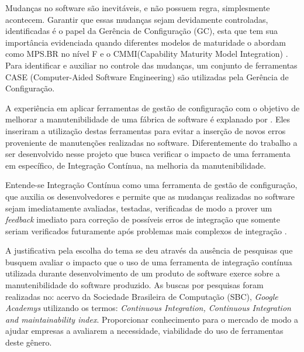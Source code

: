 Mudanças no software são inevitáveis, e não possuem regra, simplesmente acontecem. Garantir que essas mudanças sejam devidamente controladas, identificadas é o papel da  Gerência de Configuração (GC), esta que tem sua importância evidenciada quando diferentes modelos de maturidade o abordam como MPS.BR no nível F e o CMMI(Capability Maturity Model Integration) \cite{furlaneto2006}. Para identificar e auxiliar no controle das mudanças, um conjunto de ferramentas CASE (Computer-Aided Software Engineering) são utilizadas pela Gerência de Configuração.

A experiência em aplicar ferramentas  de gestão de configuração com o objetivo de melhorar a manutenibilidade de uma fábrica de software é explanado por . Eles inseriram a utilização destas ferramentas para evitar a inserção de novos erros proveniente de manutenções realizadas no software. Diferentemente do trabalho a ser desenvolvido nesse projeto que busca verificar o impacto de uma ferramenta em específico, de Integração Contínua,  na melhoria da manutenibilidade.

Entende-se Integração Contínua como uma ferramenta de gestão de configuração, que auxilia os desenvolvedores e permite que as mudanças realizadas no software sejam imediatamente avaliadas, testadas, verificadas de modo a prover um  \textit{feedback} imediato para correção de possíveis erros de integração que somente seriam verificados futuramente após problemas mais complexos de integração \cite{paul2007}.

A justificativa pela escolha do tema se deu através da ausência de pesquisas que busquem avaliar o impacto que o uso de uma ferramenta de integração contínua utilizada durante desenvolvimento de um produto de software exerce sobre a manutenibilidade do software produzido. As buscas por pesquisas foram realizadas no: acervo da Sociedade Brasileira de Computação (SBC), \textit{Google Academys} utilizando os termos: \textit{Continuous Integration, Continuous Integration and maintainability index}. Proporcionar conhecimento para o mercado de modo a ajudar empresas a avaliarem a necessidade, viabilidade do uso de ferramentas deste gênero.